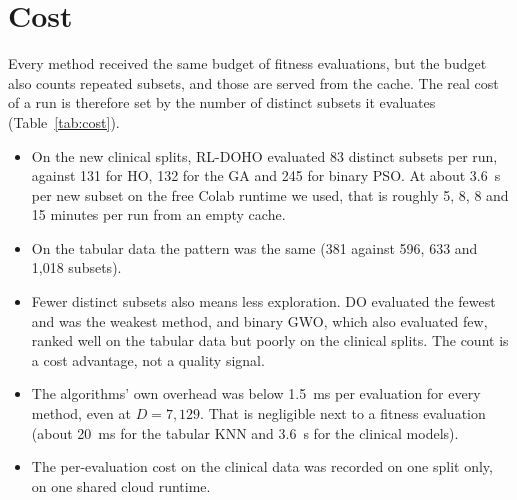 \documentclass[journal]{IEEEtran}
\begin{document}
\section{Cost}
Every method received the same budget of fitness evaluations, but the budget also counts repeated subsets, and those are served from the cache. The real cost of a run is therefore set by the number of distinct subsets it evaluates (Table~\ref{tab:cost}).
\begin{itemize}
\item On the new clinical splits, RL-DOHO evaluated 83 distinct subsets per run, against 131 for HO, 132 for the GA and 245 for binary PSO. At about 3.6~s per new subset on the free Colab runtime we used, that is roughly 5, 8, 8 and 15 minutes per run from an empty cache.
\item On the tabular data the pattern was the same (381 against 596, 633 and 1,018 subsets).
\item Fewer distinct subsets also means less exploration. DO evaluated the fewest and was the weakest method, and binary GWO, which also evaluated few, ranked well on the tabular data but poorly on the clinical splits. The count is a cost advantage, not a quality signal.
\item The algorithms' own overhead was below 1.5~ms per evaluation for every method, even at $D=7{,}129$. That is negligible next to a fitness evaluation (about 20~ms for the tabular KNN and 3.6~s for the clinical models).
\item The per-evaluation cost on the clinical data was recorded on one split only, on one shared cloud runtime.
\end{itemize}
\end{document}
